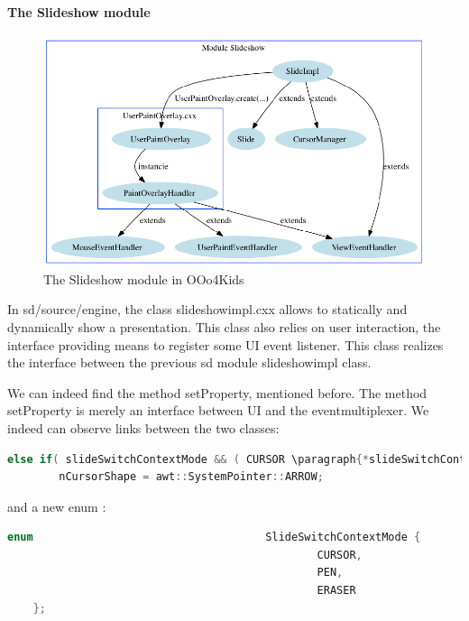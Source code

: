 \documentclass[a4paper,11pt]{article}
\begin{document}
\paragraph{The Slideshow module}

\begin{figure}[!h]
\centering
\includegraphics[scale=0.5]{images/Slideshow_module.png}
\caption{The Slideshow module in OOo4Kids}
\end{figure}   

In sd/source/engine, the class slideshowimpl.cxx allows to statically and dynamically show a presentation. This class also relies on user interaction, the interface providing means to register some UI event listener. This class realizes the interface between the previous sd module slideshowimpl class.

We can indeed find the method setProperty, mentioned before. The method setProperty is merely an interface between UI and the eventmultiplexer. We indeed can observe links between the two classes:

\begin{lstlisting}[language=C++]
    else if( slideSwitchContextMode && ( CURSOR \paragraph{*slideSwitchContextMode ))
        nCursorShape = awt::SystemPointer::ARROW;
\end{lstlisting}

and a new enum :

\begin{lstlisting}[language=C++]
    enum                                    SlideSwitchContextMode {
                                                CURSOR,
                                                PEN,
                                                ERASER
    };
\end{lstlisting}
\end{document}
